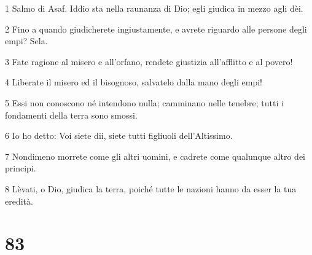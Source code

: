 \par 1 Salmo di Asaf. Iddio sta nella raunanza di Dio; egli giudica in mezzo agli dèi.
\par 2 Fino a quando giudicherete ingiustamente, e avrete riguardo alle persone degli empi? Sela.
\par 3 Fate ragione al misero e all'orfano, rendete giustizia all'afflitto e al povero!
\par 4 Liberate il misero ed il bisognoso, salvatelo dalla mano degli empi!
\par 5 Essi non conoscono né intendono nulla; camminano nelle tenebre; tutti i fondamenti della terra sono smossi.
\par 6 Io ho detto: Voi siete dii, siete tutti figliuoli dell'Altissimo.
\par 7 Nondimeno morrete come gli altri uomini, e cadrete come qualunque altro dei principi.
\par 8 Lèvati, o Dio, giudica la terra, poiché tutte le nazioni hanno da esser la tua eredità.

\chapter{83}

